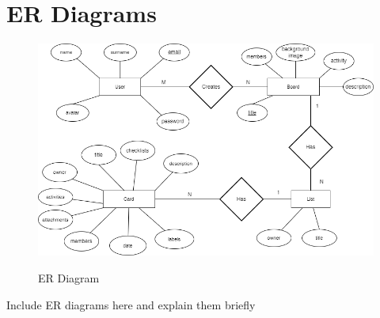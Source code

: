 \section{ER Diagrams}
\begin{figure}[h]
    \centering
    \includegraphics[width = 1.1\textwidth]{ER Diagram.drawio.png}\\[0.1in]
    \caption{ER Diagram}
    \label{fig:my_label}
\end{figure}
Include ER diagrams here and explain them
briefly



